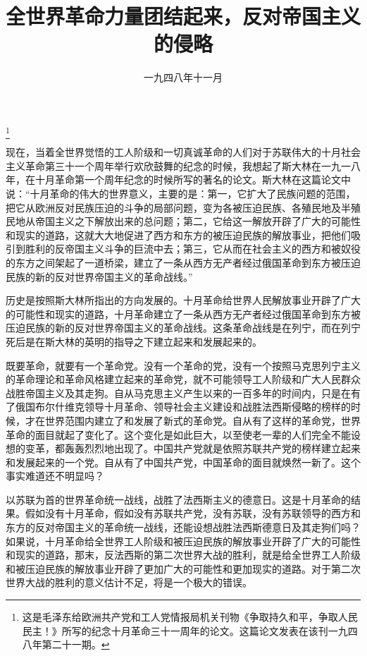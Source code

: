 
\title{全世界革命力量团结起来，反对帝国主义的侵略}
\date{一九四八年十一月}
\thanks{这是毛泽东给欧洲共产党和工人党情报局机关刊物《争取持久和平，争取人民民主！》所写的纪念十月革命三十一周年的论文。这篇论文发表在该刊一九四八年第二十一期。}
\maketitle


现在，当着全世界觉悟的工人阶级和一切真诚革命的人们对于苏联伟大的十月社会主义革命第三十一个周年举行欢欣鼓舞的纪念的时候，我想起了斯大林在一九一八年，在十月革命第一个周年纪念的时候所写的著名的论文。斯大林在这篇论文中说：“十月革命的伟大的世界意义，主要的是：第一，它扩大了民族问题的范围，把它从欧洲反对民族压迫的斗争的局部问题，变为各被压迫民族、各殖民地及半殖民地从帝国主义之下解放出来的总问题；第二，它给这一解放开辟了广大的可能性和现实的道路，这就大大地促进了西方和东方的被压迫民族的解放事业，把他们吸引到胜利的反帝国主义斗争的巨流中去；第三，它从而在社会主义的西方和被奴役的东方之间架起了一道桥梁，建立了一条从西方无产者经过俄国革命到东方被压迫民族的新的反对世界帝国主义的革命战线。”

历史是按照斯大林所指出的方向发展的。十月革命给世界人民解放事业开辟了广大的可能性和现实的道路，十月革命建立了一条从西方无产者经过俄国革命到东方被压迫民族的新的反对世界帝国主义的革命战线。这条革命战线是在列宁，而在列宁死后是在斯大林的英明的指导之下建立起来和发展起来的。

既要革命，就要有一个革命党。没有一个革命的党，没有一个按照马克思列宁主义的革命理论和革命风格建立起来的革命党，就不可能领导工人阶级和广大人民群众战胜帝国主义及其走狗。自从马克思主义产生以来的一百多年的时间内，只是在有了俄国布尔什维克领导十月革命、领导社会主义建设和战胜法西斯侵略的榜样的时候，才在世界范围内建立了和发展了新式的革命党。自从有了这样的革命党，世界革命的面目就起了变化了。这个变化是如此巨大，以至使老一辈的人们完全不能设想的变革，都轰轰烈烈地出现了。中国共产党就是依照苏联共产党的榜样建立起来和发展起来的一个党。自从有了中国共产党，中国革命的面目就焕然一新了。这个事实难道还不明显吗？

以苏联为首的世界革命统一战线，战胜了法西斯主义的德意日。这是十月革命的结果。假如没有十月革命，假如没有苏联共产党，没有苏联，没有苏联领导的西方和东方的反对帝国主义的革命统一战线，还能设想战胜法西斯德意日及其走狗们吗？如果说，十月革命给全世界工人阶级和被压迫民族的解放事业开辟了广大的可能性和现实的道路，那末，反法西斯的第二次世界大战的胜利，就是给全世界工人阶级和被压迫民族的解放事业开辟了更加广大的可能性和更加现实的道路。对于第二次世界大战的胜利的意义估计不足，将是一个极大的错误。

